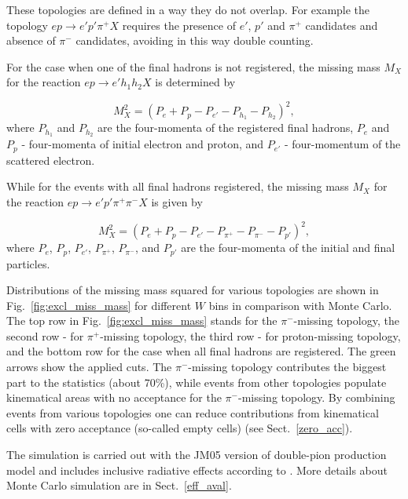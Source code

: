 These topologies are defined in a way they do not overlap. For example the topology $e p \rightarrow e' p' \pi^{+} X$ requires the presence of $e'$, $p'$ and $\pi^{+}$ candidates and absence of $\pi^{-}$ candidates, avoiding in this way double counting.


For the case when one of the final hadrons is not registered, the missing mass $M_{X}$ for the reaction $e p \rightarrow e' h_1 h_2 X$ is determined by 



\begin{equation}
M_{X}^{2} = (P_{e} + P_{p} -P_{e'} - P_{h_1} - P_{h_2})^{2},
\label{eg:miss_mass}
\end{equation} 
where $P_{h_1}$ and $P_{h_2}$ are the four-momenta of the registered final hadrons, $P_{e}$ and $P_{p}$ - four-momenta of initial electron and proton, and $P_{e'}$ - four-momentum of the scattered electron.

While for the events with all final hadrons registered, the missing mass $M_{X}$ for the reaction $e p \rightarrow e' p' \pi^+ \pi^- X$ is given by

\begin{equation}
M_{X}^{2} = (P_{e} + P_{p} -P_{e'} - P_{\pi^+} - P_{\pi^-} - P_{p'})^{2},
\label{eg:miss_mass_zero}
\end{equation} 
where $P_{e}$, $P_{p}$, $P_{e'}$, $P_{\pi^+}$, $P_{\pi^-}$,  and $P_{p'}$  are the four-momenta of the initial and final particles.

Distributions of the missing mass squared for various topologies are shown in Fig.~\ref{fig:excl_miss_mass} for different $W$ bins in comparison with Monte Carlo. The top row in Fig.~\ref{fig:excl_miss_mass} stands for the $\pi^-$-missing topology, the second row - for $\pi^+$-missing topology, the third row - for proton-missing topology, and the bottom row for the case when all final hadrons are registered. The green arrows show the applied cuts. The $\pi^-$-missing topology contributes the biggest part to the statistics (about 70\%), while events from other topologies populate kinematical areas with no acceptance for the $\pi^-$-missing topology. 
By combining events from various topologies one can reduce contributions from kinematical cells with zero acceptance (so-called empty cells) (see Sect.~\ref{zero_acc}).

The simulation is carried out with the JM05 version of double-pion production model \cite{Ripani:2000va,Aznauryan:2005tp,Mokeev:2005re} and includes inclusive radiative effects according to \cite{Mo:1968cg}. More details about Monte Carlo simulation are in Sect.~\ref{eff_aval}.



